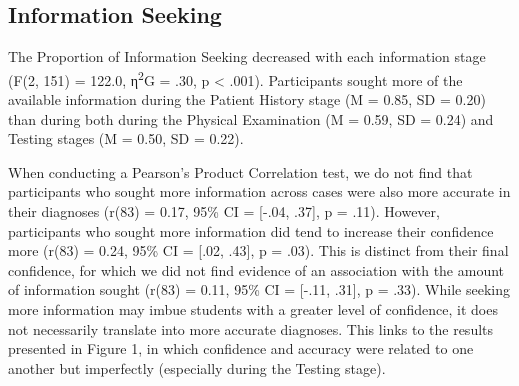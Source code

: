 \documentclass[a4paper, nobind]{templates/ociamthesis}
\begin{document}
\hypertarget{information-seeking-1}{%
\subsection{Information Seeking}\label{information-seeking-1}}

The Proportion of Information Seeking decreased with each information stage (F(2, 151) = 122.0, η\textsuperscript{2}G = .30, p \textless{} .001). Participants sought more of the available information during the Patient History stage (M = 0.85, SD = 0.20) than during both during the Physical Examination (M = 0.59, SD = 0.24) and Testing stages (M = 0.50, SD = 0.22).

When conducting a Pearson's Product Correlation test, we do not find that participants who sought more information across cases were also more accurate in their diagnoses (r(83) = 0.17, 95\% CI = {[}-.04, .37{]}, p = .11). However, participants who sought more information did tend to increase their confidence more (r(83) = 0.24, 95\% CI = {[}.02, .43{]}, p = .03). This is distinct from their final confidence, for which we did not find evidence of an association with the amount of information sought (r(83) = 0.11, 95\% CI = {[}-.11, .31{]}, p = .33). While seeking more information may imbue students with a greater level of confidence, it does not necessarily translate into more accurate diagnoses. This links to the results presented in Figure 1, in which confidence and accuracy were related to one another but imperfectly (especially during the Testing stage).
\end{document}
